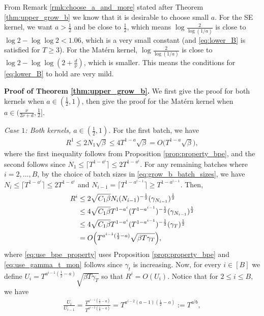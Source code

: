 \documentclass[10pt]{article}
\begin{document}
From Remark \ref{rmk:choose_a_and_more} stated after Theorem \ref{thm:upper_grow_b} we know that it is desirable to choose small $a$. For the SE kernel, we want $a>\frac{1}{2}$ and be close to $\frac{1}{2}$, which means $\log \frac{2}{\log(1/a)}$ is close to $\log2 - \log\log 2 < 1.06 $, which is a very small constant (and \eqref{eq:lower_B} is satisfied for $T\geq 3$). For the Mat\'ern kernel, $\log \frac{2}{\log(1/a)}$ is close to $\log 2 - \log\log (2+\frac{d}{\nu})$, which is smaller. This means the conditions for \eqref{eq:lower_B} to hold are very mild.

\textbf{Proof of Theorem \ref{thm:upper_grow_b}.} 
We first give the proof for both kernels when $a\in(\frac{1}{2}, 1)$, then give the proof for the Mat\'ern kernel when $a\in (\frac{\nu}{2\nu+d}, \frac{1}{2}] $.

\emph{Case $1$: Both kernels, $a\in(\frac{1}{2}, 1)$.}
For the first batch, we have
\begin{align}
    R^1 
    \leq 2N_1\sqrt{\beta}
    \leq 4T^{1-a}\sqrt{\beta}
    = O\bigl(T^{1-a} \sqrt{\beta}\bigr),
\end{align}
where the first inequality follows from Proposition \ref{prop:property_bpe}, and the second follows since
$N_1 \leq \lceil T^{1-a^i} \rceil \leq 2T^{1-a^i} $.
For any remaining batches where $i = 2,\ldots, B$, 
by the choice of batch sizes in \eqref{eq:grow_b_batch_sizes}, we have $N_{i} \leq \lceil T^{1-a^{i}} \rceil \leq 2T^{1-a^{i}}$ and $N_{i-1} = \lceil T^{1-a^{i-1}} \rceil \geq T^{1-a^{i-1}} $.
Then, 
\begin{align}
    R^i
    & \leq 2\sqrt{C_1\beta} N_i(N_{i-1})^{-\frac{1}{2}}(\gamma_{N_{i-1}})^{\frac{1}{2}} \label{eq:use_bpe_property} \\
    & \leq 4\sqrt{C_1\beta} T^{1-a^i} (T^{1-a^{i-1}})^{-\frac{1}{2}}(\gamma_{N_{i-1}})^{\frac{1}{2}} \\
    & \leq 4\sqrt{C_1\beta} T^{1-a^i} (T^{1-a^{i-1}})^{-\frac{1}{2}}(\gamma_T)^{\frac{1}{2}} \label{eq:use_gamma_t_mon} \\
    & = O\Bigl( T^{a^{i-1}(\frac{1}{2}-a)}  \sqrt{\beta T\gamma_T} \Bigr),
\end{align}
where \eqref{eq:use_bpe_property} uses Proposition \ref{prop:property_bpe}
and \eqref{eq:use_gamma_t_mon} follows since $\gamma_t$ is increasing. 
Now, for every $i\in[B]$ we define $U_i= T^{a^{i-1}(\frac{1}{2}-a)}  \sqrt{\beta T\gamma_T} $ so that $R^i=O(U_i)$. Notice that for $2\leq i \leq B$, we have
\begin{align}
    \frac{U_{i}}{U_{i-1}}
    = \frac{T^{a^{i-1}(\frac{1}{2}-a)} }{T^{a^{i-2}(\frac{1}{2}-a)}}
    = T^{a^{i-2}(a-1)(\frac{1}{2}-a)}
    := T^{a^{j}b},
\end{align}
\end{document}
